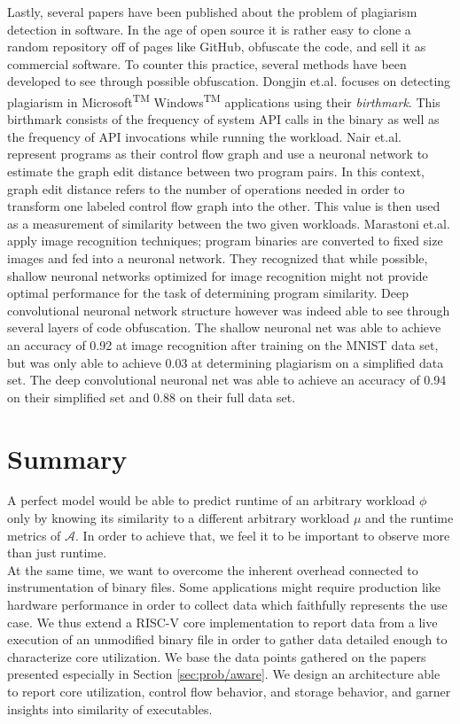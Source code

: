 \documentclass[../bachelor_paper.tex]{subfiles}
\begin{document}
Lastly, several papers have been published about the problem of plagiarism detection in software. In the age of open source it is rather easy to clone a random repository off of pages like GitHub, obfuscate the code, and sell it as commercial software. To counter this practice, several methods have been developed to see through possible obfuscation. Dongjin et.al. \cite{kimMeasuringSimilarityWindows2013} focuses on detecting plagiarism in Microsoft\textsuperscript{TM} Windows\textsuperscript{TM} applications using their \emph{birthmark}. This birthmark consists of the frequency of system \acs{API} calls in the binary as well as the frequency of \acs{API} invocations while running the workload. Nair et.al. \cite{nairFuncGNNGraphNeural2020} represent programs as their control flow graph and use a neuronal network to estimate the graph edit distance between two program pairs. In this context, graph edit distance refers to the number of operations needed in order to transform one labeled control flow graph into the other. This value is then used as a measurement of similarity between the two given workloads. Marastoni et.al. \cite{marastoniDeepLearningApproach2018} apply image recognition techniques; program binaries are converted to fixed size images and fed into a neuronal network. They recognized that while possible, shallow neuronal networks optimized for image recognition might not provide optimal performance for the task of determining program similarity. Deep convolutional neuronal network structure however was indeed able to see through several layers of code obfuscation. The shallow neuronal net was able to achieve an accuracy of 0.92 at image recognition after training on the MNIST data set, but was only able to achieve 0.03 at determining plagiarism on a simplified data set. The deep convolutional neuronal net was able to achieve an accuracy of 0.94 on their simplified set and 0.88 on their full data set.

\section{Summary}
	\label{ch:theo/simi/summ}
A perfect model would be able to predict runtime of an arbitrary workload $\phi$ only by knowing its similarity to a different arbitrary workload $\mu$ and the runtime metrics of $\mathcal{A}$. In order to achieve that, we feel it to be important to observe more than just runtime.\\
At the same time, we want to overcome the inherent overhead connected to instrumentation of binary files. Some applications might require production like hardware performance in order to collect data which faithfully represents the use case. We thus extend a RISC-V core implementation to report data from a live execution of an unmodified binary file in order to gather data detailed enough to characterize core utilization. We base the data points gathered on the papers presented especially in Section \ref{sec:prob/aware}. We design an architecture able to report core utilization, control flow behavior, and storage behavior, and garner insights into similarity of executables.



\isstandalone



\fi
\end{document}
